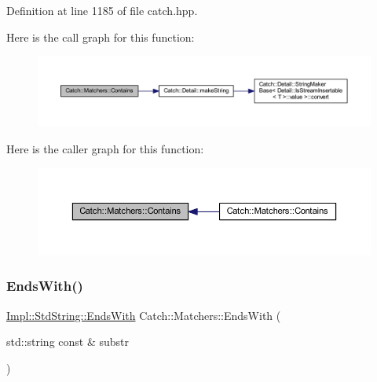 Definition at line 1185 of file catch.\+hpp.

Here is the call graph for this function\+:\nopagebreak
\begin{figure}[H]
\begin{center}
\leavevmode
\includegraphics[width=350pt]{namespace_catch_1_1_matchers_a7bc27b5c696118cbe54690d6c524b3d9_cgraph}
\end{center}
\end{figure}
Here is the caller graph for this function\+:\nopagebreak
\begin{figure}[H]
\begin{center}
\leavevmode
\includegraphics[width=350pt]{namespace_catch_1_1_matchers_a7bc27b5c696118cbe54690d6c524b3d9_icgraph}
\end{center}
\end{figure}
\hypertarget{namespace_catch_1_1_matchers_a1e32a2d23a1eb9eda9840c712c7b00c1}{}\label{namespace_catch_1_1_matchers_a1e32a2d23a1eb9eda9840c712c7b00c1} 
\subsubsection{\texorpdfstring{Ends\+With()}{EndsWith()}\hspace{0.1cm}{\footnotesize\ttfamily [1/2]}}
{\footnotesize\ttfamily \hyperlink{struct_catch_1_1_matchers_1_1_impl_1_1_std_string_1_1_ends_with}{Impl\+::\+Std\+String\+::\+Ends\+With} Catch\+::\+Matchers\+::\+Ends\+With (\begin{DoxyParamCaption}\item[{std\+::string const \&}]{substr }\end{DoxyParamCaption})\hspace{0.3cm}{\ttfamily [inline]}}



